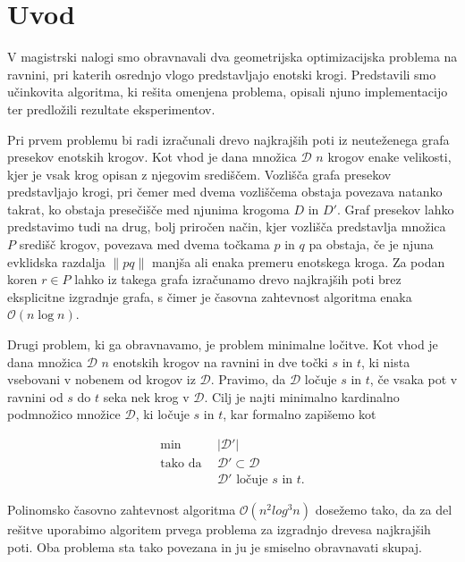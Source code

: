 \documentclass[a4paper, 12pt]{book}
\newcommand{\D}{\ensuremath{\mathcal{D}}}
\newcommand{\OO}{\ensuremath{\mathcal{O}}} %
\newcommand{\clearemptydoublepage}{\newpage{\pagestyle{empty}\cleardoublepage}}
\begin{document}
\clearemptydoublepage

\mainmatter
\setcounter{page}{1}
\pagestyle{fancy}

\chapter{Uvod}
V magistrski nalogi smo obravnavali dva geometrijska optimizacijska problema na ravnini, pri katerih osrednjo vlogo predstavljajo enotski krogi. Predstavili smo učinkovita algoritma, ki rešita omenjena problema, opisali njuno implementacijo ter predložili rezultate eksperimentov.

Pri prvem problemu bi radi izračunali drevo najkrajših poti iz neuteženega grafa presekov enotskih krogov. Kot vhod je dana množica $\D$ $n$ krogov enake velikosti, kjer je vsak krog opisan z njegovim središčem. Vozlišča grafa presekov predstavljajo krogi, pri čemer med dvema vozliščema obstaja povezava natanko takrat, ko obstaja presečišče med njunima krogoma $D$ in $D'$. Graf presekov lahko predstavimo tudi na drug, bolj priročen način, kjer vozlišča predstavlja množica $P$ središč krogov, povezava med dvema točkama $p$ in $q$ pa obstaja, če je njuna evklidska razdalja $\|pq\|$ manjša ali enaka premeru enotskega kroga. Za podan koren $r \in P$ lahko iz takega grafa izračunamo drevo najkrajših poti brez eksplicitne izgradnje grafa, s čimer je časovna zahtevnost algoritma enaka $\OO(n\log n)$.

Drugi problem, ki ga obravnavamo, je problem minimalne ločitve. Kot vhod je dana množica $\D$ $n$ enotskih krogov na ravnini in dve točki $s$ in $t$, ki nista vsebovani v nobenem od krogov iz $\D$. Pravimo, da $\D$ ločuje $s$ in $t$, če vsaka pot v ravnini od $s$ do $t$ seka nek krog v $\D$. Cilj je najti minimalno kardinalno podmnožico množice $\D$, ki ločuje $s$ in $t$, kar formalno zapišemo kot 

\begin{align*}
	\min ~~		& |\D'|\\
	 \mbox{tako da}~~ & \D'\subset \D\\
				&	\D'\text{ ločuje $s$ in $t$}. 
\end{align*}

Polinomsko časovno zahtevnost algoritma $\OO(n^2log^3n)$ dosežemo tako, da za del rešitve uporabimo algoritem prvega problema za izgradnjo drevesa najkrajših poti. Oba problema sta tako povezana in ju je smiselno obravnavati skupaj.
\end{document}
